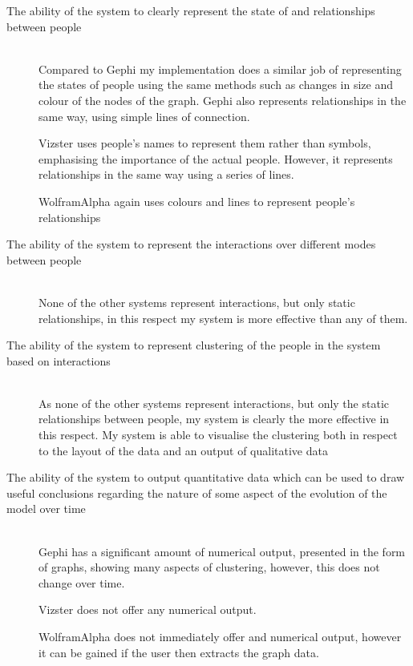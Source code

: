 \documentclass[12pt,a4paper]{article}
\begin{document}
\begin{description}
	\item[The ability of the system to clearly represent the state of and relationships between people] \hfill \\
	Compared to Gephi my implementation does a similar job of representing the states of people using the same methods such as changes in size and colour of the nodes of the graph. Gephi also represents relationships in the same way, using simple lines of connection.
	
	Vizster uses people's names to represent them rather than symbols, emphasising the importance of the actual people. However, it represents relationships in the same way using a series of lines.
	
	WolframAlpha again uses colours and lines to represent people's relationships
	
	\item[The ability of the system to represent the interactions over different modes between people] \hfill \\
	None of the other systems represent interactions, but only static relationships, in this respect my system is more effective than any of them.
	
	\item[The ability of the system to represent clustering of the people in the system based on interactions] \hfill \\
	As none of the other systems represent interactions, but only the static relationships between people, my system is clearly the more effective in this respect. My system is able to visualise the clustering both in respect to the layout of the data and an output of qualitative data
	
	\item[The ability of the system to output quantitative data which can be used to draw useful conclusions regarding the nature of some aspect of the evolution of the model over time] \hfill \\
	Gephi has a significant amount of numerical output, presented in the form of graphs, showing many aspects of clustering, however, this does not change over time.
	
	Vizster does not offer any numerical output.
	
	WolframAlpha does not immediately offer and numerical output, however it can be gained if the user then extracts the graph data.
\end{description}
\end{document}
